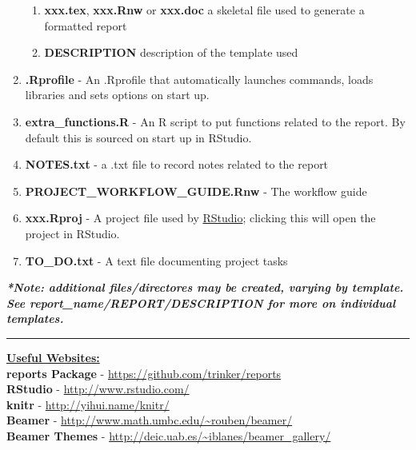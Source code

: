 \documentclass{article}\usepackage{graphicx, color}
\begin{document}
\begin{enumerate}
\begin{enumerate}
    \item \textbf{xxx.tex}, \textbf{xxx.Rnw} or \textbf{xxx.doc} a skeletal file used to generate a formatted report
    \item \textbf{DESCRIPTION} description of the template used
  \end{enumerate} 
  \item \textbf{.Rprofile} - An .Rprofile that automatically launches commands, loads libraries and sets options on start up.
  \item \textbf{extra\_functions.R} - An R script to put functions related to the report.  By default this is sourced on start up in RStudio.  
  \item \textbf{NOTES.txt} - a .txt file to record notes related to the report
  \item \textbf{PROJECT\_WORKFLOW\_GUIDE.Rnw} - The workflow guide
  \item \textbf{xxx.Rproj} - A project file used by \href{http://www.rstudio.com/}{RStudio}; clicking this will open the project in RStudio. 
  \item \textbf{TO\_DO.txt} - A text file documenting project tasks
\end{enumerate}
\vspace{1.5 mm}
{\scriptsize \textbf{\emph{*Note: additional files/directores may be created, varying by template. See \texttildelow report\_name/REPORT/DESCRIPTION for more on individual templates.}}}
\vspace{3 mm}
\hrule
\vspace{3 mm}
\noindent \textbf{\underline{Useful Websites:}} \vspace{1.5 mm} \\ 
\textbf{reports Package} - \href{https://github.com/trinker/reports}{https://github.com/trinker/reports}\\ 
\textbf{RStudio} - \href{http://www.rstudio.com/}{http://www.rstudio.com/}\\
\textbf{knitr} - \href{http://yihui.name/knitr/}{http://yihui.name/knitr/}\\
\textbf{Beamer} - \url{http://www.math.umbc.edu/~rouben/beamer/}\\
\textbf{Beamer Themes} - \url{http://deic.uab.es/~iblanes/beamer_gallery/}\\
\end{document}
